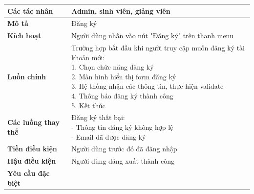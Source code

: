 \begin{tabular}{|l|l|}
	\hline
	\textbf{Các tác nhân}       & Admin, sinh viên, giảng viên                                                   \\
	\hline
	\textbf{Mô tả}              & Đăng ký                                                                        \\
	\hline
	\textbf{Kích hoạt}          & Người dùng nhấn vào nút "Đăng ký" trên thanh menu                              \\
	\hline
	\textbf{Luồn chính}         & \makecell[l]{Trường hợp bắt đầu khi người truy cập muốn đăng ký tài khoản mới: \\ 1. Chọn chức năng đăng ký \\ 2. Màn hình hiển thị form đăng ký \\ 3. Hệ thống nhận các thông tin, thực hiện validate \\ 4. Thông báo đăng ký thành công \\ 5. Kết thúc} \\
	\hline
	\textbf{Các luồng thay thế} & \makecell[l]{Đăng ký thất bại:                                                 \\ - Thông tin đăng ký không hợp lệ \\ - Email đã được đăng ký} \\
	\hline
	\textbf{Tiền điều kiện}     & Người dùng trước đó đã đăng nhập                                               \\
	\hline
	\textbf{Hậu điều kiện}      & Người dùng đăng xuất thành công                                                \\
	\hline
	\textbf{Yêu cầu đặc biệt}   &                                                                                \\
	\hline
\end{tabular}

